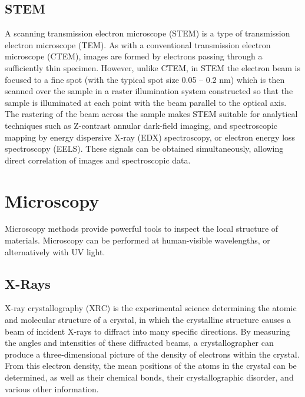 \documentclass[book.tex]{subfiles}
\begin{document}
\subsection{STEM}
A scanning transmission electron microscope (STEM) is a type of transmission electron microscope (TEM). As with a conventional transmission electron microscope (CTEM), images are formed by electrons passing through a sufficiently thin specimen. However, unlike CTEM, in STEM the electron beam is focused to a fine spot (with the typical spot size 0.05 – 0.2 nm) which is then scanned over the sample in a raster illumination system constructed so that the sample is illuminated at each point with the beam parallel to the optical axis. The rastering of the beam across the sample makes STEM suitable for analytical techniques such as Z-contrast annular dark-field imaging, and spectroscopic mapping by energy dispersive X-ray (EDX) spectroscopy, or electron energy loss spectroscopy (EELS). These signals can be obtained simultaneously, allowing direct correlation of images and spectroscopic data.
\section{Microscopy}

Microscopy methods provide powerful tools to inspect the local structure of materials. Microscopy can be performed at human-visible wavelengths, or alternatively with UV light.

\subsection{X-Rays}

X-ray crystallography (XRC) is the experimental science determining the atomic and molecular structure of a crystal, in which the crystalline structure causes a beam of incident X-rays to diffract into many specific directions. By measuring the angles and intensities of these diffracted beams, a crystallographer can produce a three-dimensional picture of the density of electrons within the crystal. From this electron density, the mean positions of the atoms in the crystal can be determined, as well as their chemical bonds, their crystallographic disorder, and various other information.
\end{document}
